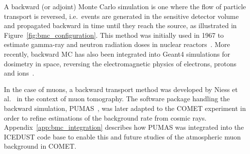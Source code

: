 A backward (or adjoint) Monte Carlo simulation is one where the flow of particle
transport is reversed, i.e.\ events are generated in the sensitive detector
volume and propagated backward in time until they reach the source, as
illustrated in Figure~\ref{fig:bmc_configuration}. This method
was initially used in 1967 to estimate gamma-ray and neutron radiation doses in
nuclear reactors~\cite{doi:10.13182/NSE68-A19235,doi:10.13182/NSE69-A19116}.
More recently, backward MC has also been integrated into Geant4
simulations for dosimetry in space, reversing the
electromagnetic physics of electrons, protons and ions~\cite{DESORGHER2010247}.

In the case of muons, a backward transport method was developed by Niess et
al.~\cite{Niess_Barnoud_Carloganu_Menedeu_2018} in the context of muon
tomography. The software package handling the backward simulation,
PUMAS~\cite{NIESS2022108438}, was later adapted to the COMET experiment in order
to refine estimations of the background rate from cosmic rays.
Appendix~\ref{app:bmc_integration} describes how PUMAS was integrated into the
ICEDUST code base to enable this and future studies of the atmospheric muon
background in COMET.

